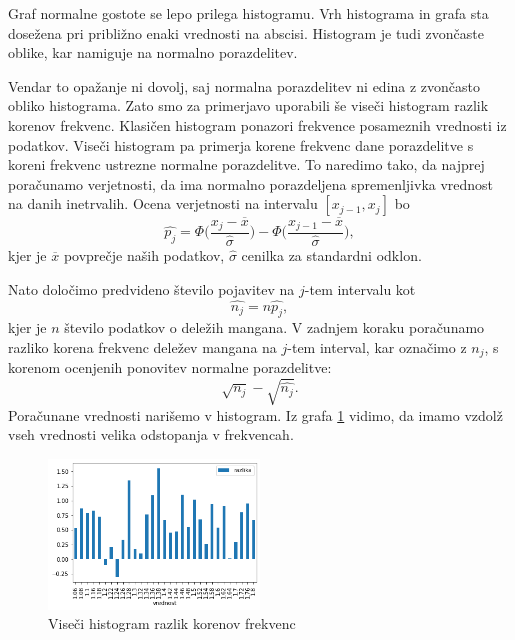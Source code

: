 \documentclass{article}
\begin{document}
Graf normalne gostote se lepo prilega histogramu. Vrh histograma in grafa sta dosežena pri 
približno enaki vrednosti na abscisi. Histogram je tudi zvončaste oblike, kar namiguje na normalno porazdelitev.

Vendar to opažanje ni dovolj, saj normalna porazdelitev ni edina z zvončasto obliko histograma.
Zato smo za primerjavo uporabili še viseči histogram razlik korenov frekvenc.
Klasičen histogram ponazori frekvence posameznih vrednosti iz podatkov. 
Viseči histogram pa primerja korene frekvenc dane porazdelitve s koreni frekvenc ustrezne normalne porazdelitve.
To naredimo tako, da najprej poračunamo verjetnosti, da ima normalno porazdeljena spremenljivka 
vrednost na danih inetrvalih. Ocena verjetnosti na intervalu $[x_{j-1}, x_j]$ bo
\begin{equation}
    \hat{p_j} = \Phi \biggl(\frac{x_j - \overline{x}}{\hat{\sigma}}\biggr) - \Phi\biggl(\frac{x_{j-1} - \overline{x}}{\hat{\sigma}}\biggr),
\end{equation}
kjer je $\overline{x}$ povprečje naših podatkov, $\hat{\sigma}$ cenilka za standardni odklon.

Nato določimo predvideno število pojavitev na $j$-tem intervalu kot
\begin{equation}
    \hat{n_j} = n\hat{p_j},
\end{equation}
kjer je $n$ število podatkov o deležih mangana.
V zadnjem koraku poračunamo razliko korena frekvenc deležev mangana na $j$-tem interval,
kar označimo z $n_j$, s korenom
ocenjenih ponovitev normalne porazdelitve:
\begin{equation}
    \sqrt{n_j} - \sqrt{\hat{n_j}}.
\end{equation}
Poračunane vrednosti narišemo v histogram.
Iz grafa \ref{2B} vidimo, da imamo vzdolž vseh vrednosti velika odstopanja v frekvencah.
\begin{figure}[H]
    \begin{center}
        \includegraphics*[width=0.5\textwidth]{figure2B.png}
        \caption{Viseči histogram razlik korenov frekvenc}
        \label{2B}
    \end{center}
\end{figure}
\end{document}
